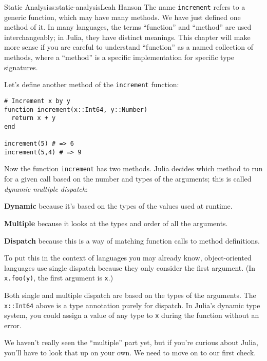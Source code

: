 \begin{aosachapter}{Static Analysis}{s:static-analysis}{Leah Hanson}
The name \texttt{increment} refers to a generic function, which may have
many methods. We have just defined one method of it. In many languages,
the terms ``function'' and ``method'' are used interchangeably; in
Julia, they have distinct meanings. This chapter will make more sense if
you are careful to understand ``function'' as a named collection of
methods, where a ``method'' is a specific implementation for specific
type signatures.

Let's define another method of the \texttt{increment} function:

\begin{verbatim}
# Increment x by y
function increment(x::Int64, y::Number)
  return x + y
end

increment(5) # => 6
increment(5,4) # => 9
\end{verbatim}

Now the function \texttt{increment} has two methods. Julia decides which
method to run for a given call based on the number and types of the
arguments; this is called \emph{dynamic multiple dispatch}:

\begin{aosaitemize}

\item
  \textbf{Dynamic} because it's based on the types of the values used at
  runtime.
\item
  \textbf{Multiple} because it looks at the types and order of all the
  arguments.
\item
  \textbf{Dispatch} because this is a way of matching function calls to
  method definitions.
\end{aosaitemize}

To put this in the context of languages you may already know,
object-oriented languages use single dispatch because they only consider
the first argument. (In \texttt{x.foo(y)}, the first argument is
\texttt{x}.)

Both single and multiple dispatch are based on the types of the
arguments. The \texttt{x::Int64} above is a type annotation purely for
dispatch. In Julia's dynamic type system, you could assign a value of
any type to \texttt{x} during the function without an error.

We haven't really seen the ``multiple'' part yet, but if you're curious
about Julia, you'll have to look that up on your own. We need to move on
to our first check.

\label{checking-the-types-of-variables-in-loops}


\end{aosachapter}
